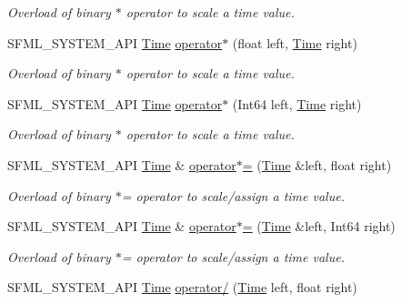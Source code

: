 \begin{DoxyCompactItemize}
\begin{DoxyCompactList}\small\item\em Overload of binary $\ast$ operator to scale a time value. \end{DoxyCompactList}\item 
S\+F\+M\+L\+\_\+\+S\+Y\+S\+T\+E\+M\+\_\+\+A\+PI \mbox{\hyperlink{classsf_1_1_time}{Time}} \mbox{\hyperlink{classsf_1_1_time_a63723c9e9c5ff6151377ec4350c6f36e}{operator$\ast$}} (float left, \mbox{\hyperlink{classsf_1_1_time}{Time}} right)
\begin{DoxyCompactList}\small\item\em Overload of binary $\ast$ operator to scale a time value. \end{DoxyCompactList}\item 
S\+F\+M\+L\+\_\+\+S\+Y\+S\+T\+E\+M\+\_\+\+A\+PI \mbox{\hyperlink{classsf_1_1_time}{Time}} \mbox{\hyperlink{classsf_1_1_time_a40a6d0938fb4a43731d54fd90bfc6476}{operator$\ast$}} (Int64 left, \mbox{\hyperlink{classsf_1_1_time}{Time}} right)
\begin{DoxyCompactList}\small\item\em Overload of binary $\ast$ operator to scale a time value. \end{DoxyCompactList}\item 
S\+F\+M\+L\+\_\+\+S\+Y\+S\+T\+E\+M\+\_\+\+A\+PI \mbox{\hyperlink{classsf_1_1_time}{Time}} \& \mbox{\hyperlink{classsf_1_1_time_a8996b6a6fcb8f3854b486b8e43949b50}{operator$\ast$=}} (\mbox{\hyperlink{classsf_1_1_time}{Time}} \&left, float right)
\begin{DoxyCompactList}\small\item\em Overload of binary $\ast$= operator to scale/assign a time value. \end{DoxyCompactList}\item 
S\+F\+M\+L\+\_\+\+S\+Y\+S\+T\+E\+M\+\_\+\+A\+PI \mbox{\hyperlink{classsf_1_1_time}{Time}} \& \mbox{\hyperlink{classsf_1_1_time_a6656a0a1a1802009a72d93fbba61f24a}{operator$\ast$=}} (\mbox{\hyperlink{classsf_1_1_time}{Time}} \&left, Int64 right)
\begin{DoxyCompactList}\small\item\em Overload of binary $\ast$= operator to scale/assign a time value. \end{DoxyCompactList}\item 
S\+F\+M\+L\+\_\+\+S\+Y\+S\+T\+E\+M\+\_\+\+A\+PI \mbox{\hyperlink{classsf_1_1_time}{Time}} \mbox{\hyperlink{classsf_1_1_time_a3386c392dbc62e51dfa59730854d1ed2}{operator/}} (\mbox{\hyperlink{classsf_1_1_time}{Time}} left, float right)

\end{DoxyCompactItemize}
